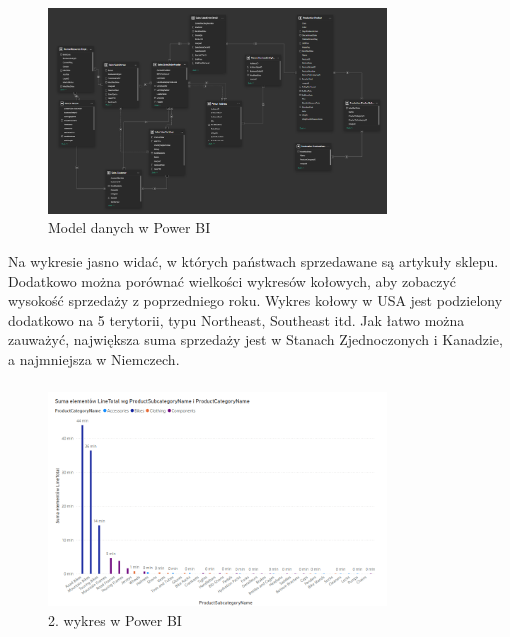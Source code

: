 \documentclass[a4paper,12pt]{article}
\begin{document}
\subsubsection{}

\begin{figure}[H]
    \centering
    \includegraphics[width=0.8\textwidth]{images/power_bi/model.png}
    \caption{Model danych w Power BI}
\end{figure}

Na wykresie jasno widać, w których państwach sprzedawane są artykuły sklepu. Dodatkowo można porównać wielkości wykresów kołowych, aby zobaczyć wysokość sprzedaży z poprzedniego roku. Wykres kołowy w USA jest podzielony dodatkowo na 5 terytorii, typu Northeast, Southeast itd. Jak łatwo można zauważyć, największa suma sprzedaży jest w Stanach Zjednoczonych i Kanadzie, a najmniejsza w Niemczech.

\subsubsection{}

\begin{figure}[H]
    \centering
    \includegraphics[width=0.8\textwidth]{images/power_bi/02.png}
    \caption{2. wykres w Power BI}
\end{figure}
\end{document}
